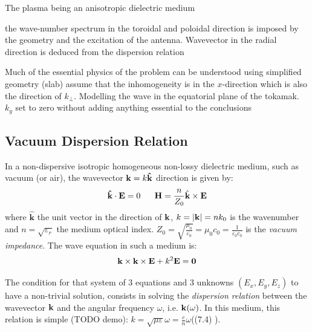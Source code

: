 The plasma being an anisotropic dielectric medium

the wave-number spectrum in the toroidal and poloidal direction is imposed by the geometry and the excitation of the antenna. Wavevector in the radial direction is deduced from the dispersion relation



Much of the essential physics of the problem can be understood using simplified geometry (slab)
assume that the inhomogeneity is in the $x$-direction which is also the direction of $k_\perp$. Modelling the wave in the equatorial plane of the tokamak. $k_y$ set to zero without adding anything essential to the conclusions



\subsection{Vacuum Dispersion Relation}
In a non-dispersive isotropic homogeneous non-lossy dielectric medium, such as vacuum (or air), the wavevector ${\mathbf k}=k\mathbf{\hat{k}}$ direction is given by:
\begin{equation}
\mathbf{\hat{k}}\cdot\mathbf{E}=0
\;\;\;\;\;\;
\mathbf{H}=\frac{n}{Z_{0}}\hat{{\mathbf k}}\times\mathbf{E}\label{eq:vecteur_onde_vide}
\end{equation}
where $\mathbf{\hat{k}}$ the unit vector in the direction of ${\mathbf k}$, $k=|{\mathbf k}|=n k_{0}$ is the wavenumber and $n=\sqrt{\varepsilon_{r}}$ the medium optical index. $Z_{0}=\sqrt{\frac{\mu_{0}}{\varepsilon_{0}}}=\mu_{0}c_{0}=\frac{1}{\varepsilon_{0}c_{0}}$ is the \emph{vacuum impedance}. The wave equation in such a medium is:
\begin{equation}
{\mathbf k} \times {\mathbf k} \times \mathbf{E} + k^{2} \mathbf{E} = \mathbf{0}
\end{equation}

The condition for that system of 3 equations and 3 unknowns $(E_{x},E_{y},E_{z})$ to have a non-trivial solution, consists in solving the \emph{dispersion relation} between the wavevector ${\mathbf k}$ and the angular frequency $\omega$, i.e. ${\mathbf k}(\omega)$. In this medium, this relation is simple (TODO demo): $k=\sqrt{\mu\varepsilon}\omega=\frac{c}{n}\omega$((7.4) ).

